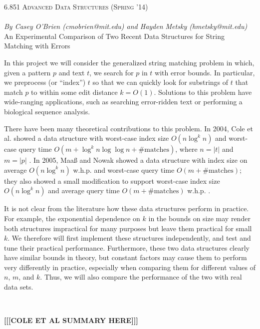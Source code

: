 \documentclass[11pt]{article}
\begin{document}
\begin{center} \Large
{\scshape 6.851 Advanced Data Structures (Spring '14)} \\[1ex]
 \\[1ex]
{\large \em By Casey O'Brien (cmobrien@mit.edu) and Hayden Metsky (hmetsky@mit.edu)} \\[2ex]
An Experimental Comparison of Two Recent Data Structures for String Matching with Errors
\end{center}

In this project we will consider the generalized string matching problem in which, given a pattern $p$ and text $t$, we search for $p$ in $t$ with error bounds.
In particular, we preprocess (or ``index'') $t$ so that we can quickly look for substrings of $t$ that match $p$ to within some edit distance $k = O(1)$.
Solutions to this problem have wide-ranging applications, such as searching error-ridden text or performing a biological sequence analysis.

There have been many theoretical contributions to this problem.
In 2004, Cole et al. showed a data structure with worst-case index size $O(n \log^k n)$ and worst-case query time $O(m + \log^k n \log \log n + \text{\# matches})$, where $n = |t|$ and $m = |p|$ \cite{cole}.
In 2005, Maa{\ss} and Nowak showed a data structure with index size on average $O(n \log^k n)$ w.h.p. and worst-case query time $O(m + \text{\# matches})$; they also showed a small modification to support worst-case index size $O(n \log^k n)$ and average query time $O(m + \text{\# matches})$ w.h.p. \cite{maas}.

It is not clear from the literature how these data structures perform in practice.
For example, the exponential dependence on $k$ in the bounds on size may render both structures impractical for many purposes but leave them practical for small $k$.
We therefore will first implement these structures independently, and test and tune their practical performance.
Furthermore, these two data structures clearly have similar bounds in theory, but constant factors may cause them to perform very differently in practice, especially when comparing them for different values of $n$, $m$, and $k$.
Thus, we will also compare the performance of the two with real data sets.

\

\textbf{[[[COLE ET AL SUMMARY HERE]]]}
\end{document}
